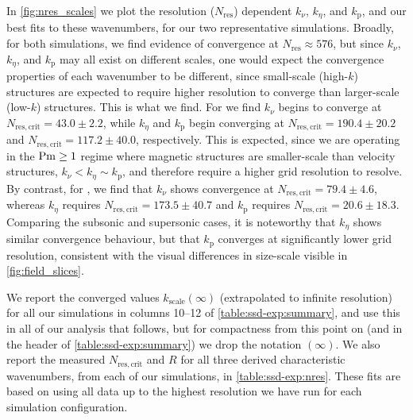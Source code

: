 In \autoref{fig:nres_scales} we plot the resolution ($N_\mathrm{res}$) dependent $k_\nu$, $k_\eta$, and $k_\mathrm{p}$, and our best fits to these wavenumbers, for our two representative simulations. Broadly, for both simulations, we find evidence of convergence at $N_\mathrm{res} \approx 576$, but since $k_\nu$, $k_\eta$, and $k_\mathrm{p}$ may all exist on different scales, one would expect the convergence properties of each wavenumber to be different, since small-scale (high-$k$) structures are expected to require higher resolution to converge than larger-scale (low-$k$) structures. This is what we find. For  we find $k_\nu$ begins to converge at $N_\mathrm{res, crit} = 43.0 \pm 2.2$, while $k_\eta$ and $k_\mathrm{p}$ begin converging at $N_\mathrm{res, crit} = 190.4 \pm 20.2$ and $N_\mathrm{res, crit} = 117.2 \pm 40.0$, respectively. This is expected, since we are operating in the $\mathrm{Pm} \geq 1$ regime where magnetic structures are smaller-scale than velocity structures, \viz \mbox{$k_\nu < k_\eta \sim k_\mathrm{p}$}, and therefore require a higher grid resolution to resolve. By contrast, for , we find that $k_\nu$ shows convergence at $N_\mathrm{res, crit} = 79.4 \pm 4.6$, whereas $k_\eta$ requires $N_\mathrm{res, crit} = 173.5 \pm 40.7$ and $k_\mathrm{p}$ requires $N_\mathrm{res, crit} = 20.6 \pm 18.3$. Comparing the subsonic and supersonic cases, it is noteworthy that $k_\eta$ shows similar convergence behaviour, but that $k_\mathrm{p}$ converges at significantly lower grid resolution, consistent with the visual differences in size-scale visible in \autoref{fig:field_slices}.

We report the converged values $k_\mathrm{scale}(\infty)$ (extrapolated to infinite resolution) for all our simulations in columns 10--12 of \autoref{table:ssd-exp:summary}, and use this in all of our analysis that follows, but for compactness from this point on (and in the header of \autoref{table:ssd-exp:summary}) we drop the notation $(\infty)$. We also report the measured $N_\mathrm{res, crit}$ and $R$ for all three derived characteristic wavenumbers, from each of our simulations, in \autoref{table:ssd-exp:nres}. These fits are based on using all data up to the highest resolution we have run for each simulation configuration.


